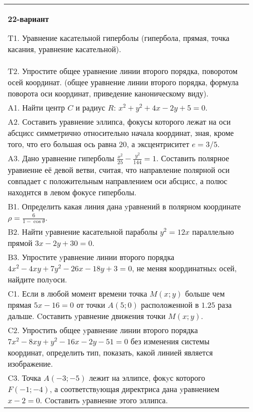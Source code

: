 \documentclass{article}
\begin{document}
\begin{tabular}{m{17cm}}
\textbf{22-вариант}
\newline

T1. Уравнение касательной гиперболы (гипербола, прямая, точка касания, уравнение касательной).\\

T2. Упростите общее уравнение линии второго порядка, поворотом осей координат. (общее уравнение линии второго порядка, формула поворота оси координат, приведение каноническому виду).\\

A1. Найти центр $C$ и радиус $R$: $x^2+y^2+4x-2y+5=0$.\\

A2. Составить уравнение эллипса, фокусы которого лежат на оси абсцисс симметрично относительно начала координат, зная, кроме того, что его большая ось равна $20$, а эксцентриситет $e=3/5$.\\

A3. Дано уравнение гиперболы $\frac{x^{2}}{25}-\frac{y^{2}}{144}=1$. Составить полярное уравиенне её девой ветви, считая, что направление полярной оси совпадает с положительным направлением оси абсцисс, а полюс находнтся в левом фокусе гиперболы.\\

B1. Определить какая линия дана yравнений в полярном координате $\rho = \frac{6}{1 - \cos\theta}$.  \\

B2. Найти yравнение касательной параболы $y^{2} = 12x$ параллельно прямой $3x - 2y + 30 = 0$.  \\

B3. Упростите yравнение линии второго порядка $4x^{2} - 4xy + 7y^{2} - 26x - 18y + 3 = 0$, не меняя координатныx осей, найдите полyоси.\\

C1. Если в любой момент времени точка $M(x;y)$ больше чем прямая $5x-16=0$ от точки $A(5;0)$ расположенной в $1.25$ раза дальше. Cоставить yравнение движения точки $M(x;y)$.  \\

C2. Упростить общее yравнение линии второго порядка $7x^{2}-8xy+y^{2}-16x-2y-51=0$ без изменения системы координат, определить тип, показать, какой линией является изображение.\\

C3. Точка $A(-3;-5)$ лежит на эллипсе, фокyс которого $F(-1;-4)$, а соответствyющая директриса дана yравнением $x-2=0$. Cоставить yравнение этого эллипса.  \\

\end{tabular}
\vspace{1cm}
\end{document}
